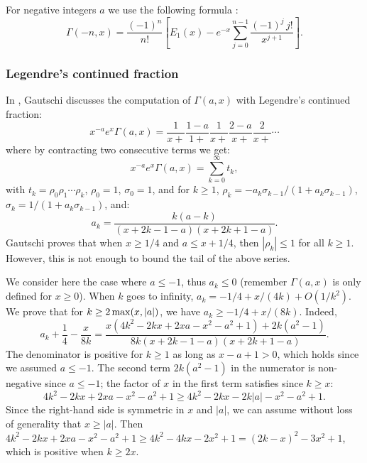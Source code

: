 \documentclass[12pt]{amsart}
\begin{document}
For negative integers $a$ we use the following formula
\cite[formula 6.5.19]{AbSt73}:
\[ \Gamma(-n,x) = \frac{(-1)^n}{n!} [E_1(x) - e^{-x}
   \sum_{j=0}^{n-1} \frac{(-1)^j \, j!}{x^{j+1}}]. \]

\subsubsection{Legendre's continued fraction}


In \cite{Gautschi79}, Gautschi discusses the computation of $\Gamma(a,x)$
with Legendre's continued fraction:
\[ x^{-a} e^x \Gamma(a,x) = \frac{1}{x+} \frac{1-a}{1+} \frac{1}{x+}
   \frac{2-a}{x+} \frac{2}{x+} \cdots \]
where by contracting two consecutive terms we get:
\begin{equation} \label{eq:legendre_cf}
x^{-a} e^x \Gamma(a,x) = \sum_{k=0}^{\infty} t_k,
\end{equation}
with $t_k = \rho_0 \rho_1 \cdots \rho_k$,
$\rho_0 = 1$, $\sigma_0 = 1$, and for $k \geq 1$,
$\rho_k = -a_k \sigma_{k-1} / (1 + a_k \sigma_{k-1})$,
$\sigma_k = 1 / (1 + a_k \sigma_{k-1})$, and:
\[ a_k = \frac{k (a-k)}{(x + 2k - 1 - a) (x + 2k + 1 - a)}. \]
Gautschi proves that when  $x \geq 1/4$ and $a \leq x + 1/4$, then
$|\rho_k| \leq 1$ for all $k \geq 1$. However, this is not enough to bound
the tail of the above series.

We consider here the case where $a \leq -1$, thus $a_k \leq 0$
(remember $\Gamma(a,x)$ is only defined for $x \geq 0$).
When $k$ goes to infinity, $a_k = -1/4 + x/(4k) + O(1/k^2)$.
We prove that for $k \geq 2 \, {\rm max}(x,|a|)$, we have
$a_k \geq -1/4 + x/(8k)$. Indeed,
\[ a_k + \frac{1}{4} - \frac{x}{8k} = 
   \frac{x(4k^2-2kx+2xa-x^2-a^2+1)+2k(a^2-1)}{8k(x+2k-1-a)(x + 2 k + 1 - a)}. \]
The denominator is positive for $k \geq 1$ as long as $x-a+1 > 0$,
which holds since we assumed $a \leq -1$.
The second term $2k(a^2-1)$ in the numerator is non-negative since $a \leq -1$;
the factor of $x$ in the first term satisfies since $k \geq x$:
\[ 4k^2-2kx+2xa-x^2-a^2+1 \geq
   4k^2-2kx-2k|a|-x^2-a^2+1. \]
Since the right-hand side is symmetric in $x$ and $|a|$, we can assume
without loss of generality that $x \geq |a|$.
Then $4k^2-2kx+2xa-x^2-a^2+1 \geq 4k^2-4kx-2x^2+1
= (2k-x)^2 -3x^2 + 1$, which is positive when $k \geq 2x$.
\end{document}
